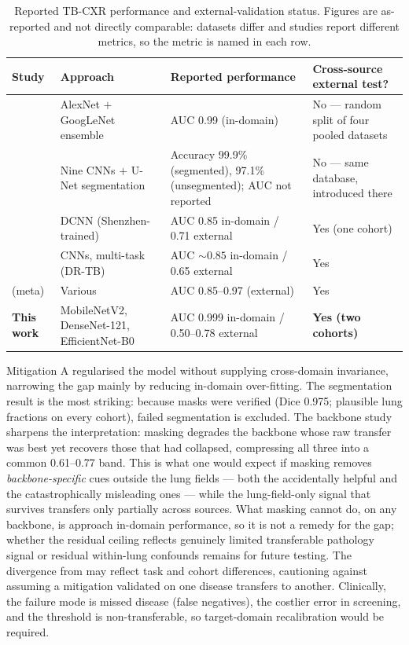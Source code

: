 \documentclass{article}
\begin{document}
\begin{table}[t]
\caption{Reported TB-CXR performance and external-validation status. Figures are as-reported and
not directly comparable: datasets differ and studies report different metrics, so the metric is
named in each row.}
\label{tab:priorwork}
\centering
\small
\begin{tabular}{p{2.9cm}p{3.3cm}p{3.7cm}p{3.2cm}}
\toprule
Study & Approach & Reported performance & Cross-source external test? \\
\midrule
\citet{lakhani2017deep} & AlexNet $+$ GoogLeNet ensemble & AUC 0.99 (in-domain) & No --- random
split of four pooled datasets \\
\citet{rahman2020reliable} & Nine CNNs $+$ U-Net segmentation & Accuracy 99.9\% (segmented),
97.1\% (unsegmented); AUC not reported & No --- same database, introduced there \\
\citet{sathitratanacheewin2020deep} & DCNN (Shenzhen-trained) & AUC 0.85 in-domain / 0.71
external & Yes (one cohort) \\
\citet{karki2022generalization} & CNNs, multi-task (DR-TB) & AUC ${\sim}0.85$ in-domain / 0.65
external & Yes \\
\citet{han2025systematic} (meta) & Various & AUC 0.85--0.97 (external) & Yes \\
\textbf{This work} & MobileNetV2, DenseNet-121, EfficientNet-B0 & AUC 0.999 in-domain /
0.50--0.78 external & \textbf{Yes (two cohorts)} \\
\bottomrule
\end{tabular}
\end{table}

Mitigation A regularised the model without supplying cross-domain invariance, narrowing the gap
mainly by reducing in-domain over-fitting. The segmentation result is the most striking: because
masks were verified (Dice 0.975; plausible lung fractions on every cohort), failed segmentation is
excluded. The backbone study sharpens the interpretation: masking degrades the backbone whose raw
transfer was best yet recovers those that had collapsed, compressing all three into a common
0.61--0.77 band. This is what one would expect if masking removes \emph{backbone-specific} cues
outside the lung fields --- both the accidentally helpful and the catastrophically misleading ones
--- while the lung-field-only signal that survives transfers only partially across sources. What
masking cannot do, on any backbone, is approach in-domain performance, so it is not a remedy for
the gap; whether the residual ceiling reflects genuinely limited transferable pathology signal or
residual within-lung confounds remains for future testing. The divergence from
\citet{bassi2022covid} may reflect task and cohort differences, cautioning against assuming a
mitigation validated on one disease transfers to another. Clinically, the failure mode is missed
disease (false negatives), the costlier error in screening, and the threshold is non-transferable,
so target-domain recalibration would be required.
\end{document}
